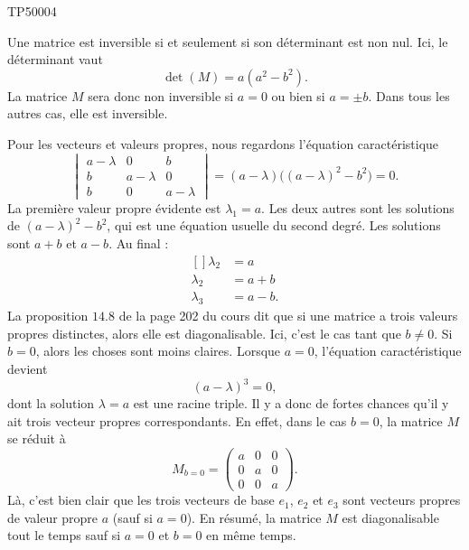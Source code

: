 \begin{corrige}{TP50004}

	Une matrice est inversible si et seulement si son déterminant est non nul. Ici, le déterminant vaut
	\begin{equation}
		\det(M)=a(a^2-b^2).
	\end{equation}
	La matrice $M$ sera donc non inversible si $a=0$ ou bien si $a=\pm b$. Dans tous les autres cas, elle est inversible.

	Pour les vecteurs et valeurs propres, nous regardons l'équation caractéristique
	\begin{equation}
		\begin{vmatrix}
			a-\lambda	&	0	&	b	\\
			b	&	a-\lambda	&	0	\\
			b	&	0	&	a-\lambda
		\end{vmatrix}=
		(a-\lambda)\big( (a-\lambda)^2-b^2 \big)=0.
	\end{equation}
	La première valeur propre évidente est $\lambda_1=a$. Les deux autres sont les solutions de $(a-\lambda)^2-b^2$, qui est une équation usuelle du second degré. Les solutions sont $a+b$ et $a-b$.  Au final :
	\begin{equation}
		\begin{aligned}[]
			\lambda_2&=a\\
			\lambda_2&=a+b\\
			\lambda_3&=a-b.
		\end{aligned}
	\end{equation}
	La proposition $14.8$ de la page 202 du cours dit que si une matrice a trois valeurs propres distinctes, alors elle est diagonalisable. Ici, c'est le cas tant que $b\neq 0$. Si $b=0$, alors les choses sont moins claires. Lorsque $a=0$, l'équation caractéristique devient
	\begin{equation}
		(a-\lambda)^3=0,
	\end{equation}
	dont la solution $\lambda=a$ est une racine triple. Il y a donc de fortes chances qu'il y ait trois vecteur propres correspondants. En effet, dans le cas $b=0$, la matrice $M$ se réduit à
	\begin{equation}
		M_{b=0}=
		\begin{pmatrix}
			a	&	0	&	0	\\
			0	&	a	&	0	\\
			0	&	0	&	a
		\end{pmatrix}.
	\end{equation}
	Là, c'est bien clair que les trois vecteurs de base $e_1$, $e_2$ et $e_3$ sont vecteurs propres de valeur propre $a$ (sauf si $a=0$). En résumé, la matrice $M$ est diagonalisable tout le temps sauf si $a=0$ et $b=0$ en même temps.


\end{corrige}
